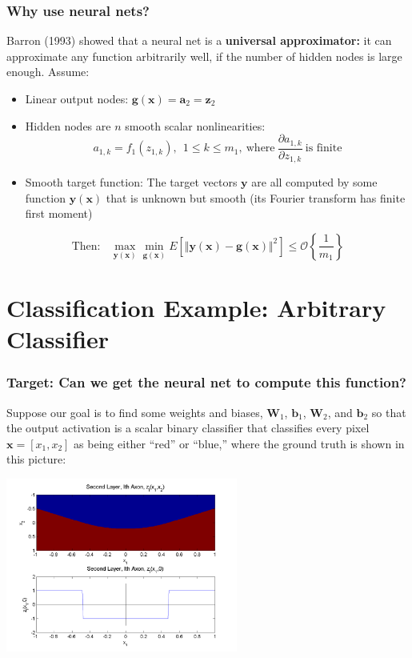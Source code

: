 \documentclass{beamer}
\begin{document}
\begin{frame}
  \frametitle{Why use neural nets?}

  Barron (1993) showed that a neural net is a {\bf universal
    approximator:} it can approximate any function arbitrarily well,
  if the number of hidden nodes is large enough.  Assume:
  \begin{itemize}
  \item Linear output nodes: $\mathbf{g}(\mathbf{x})=\mathbf{a}_2=\mathbf{z}_2$
  \item Hidden nodes are $n$ smooth scalar nonlinearities:
    \begin{displaymath}
      a_{1,k}=f_1(z_{1,k}),~~1\le k\le m_1,~\mbox{where}~
      \frac{\partial a_{1,k}}{\partial z_{1,k}}~\text{is finite}
    \end{displaymath}
  \item Smooth target function: The target vectors $\mathbf{y}$ are
    all computed by some function $\mathbf{y}(\mathbf{x})$ that is
    unknown but smooth (its Fourier transform has finite first moment)
  \end{itemize}
  \begin{displaymath}\text{Then:}~~~~
  \max_{\mathbf{y}(\mathbf{x})}
  \min_{\mathbf{g}(\mathbf{x})}
  E\left[\Vert\mathbf{y}(\mathbf{x})-\mathbf{g}(\mathbf{x})\Vert^2\right]
  \le {\mathcal O}\left\{\frac{1}{m_1}\right\}
  \end{displaymath}
\end{frame}

\section[Classification]{Classification Example: Arbitrary Classifier}
\setcounter{subsection}{1}

\begin{frame}
  \frametitle{Target: Can we get the neural net to compute this
    function?}

  Suppose our goal is to find some weights and biases, $\mathbf{W}_1$,
  $\mathbf{b}_1$, $\mathbf{W}_2$, and $\mathbf{b}_2$ so that the
  output activation is a scalar binary classifier that classifies
  every pixel $\mathbf{x}=[x_1,x_2]$ as being either ``red'' or
  ``blue,'' where the ground truth is shown in this picture:

  \centerline{\includegraphics[width=3in]{figs/nn_axon2.png}}
\end{frame}
\end{document}
